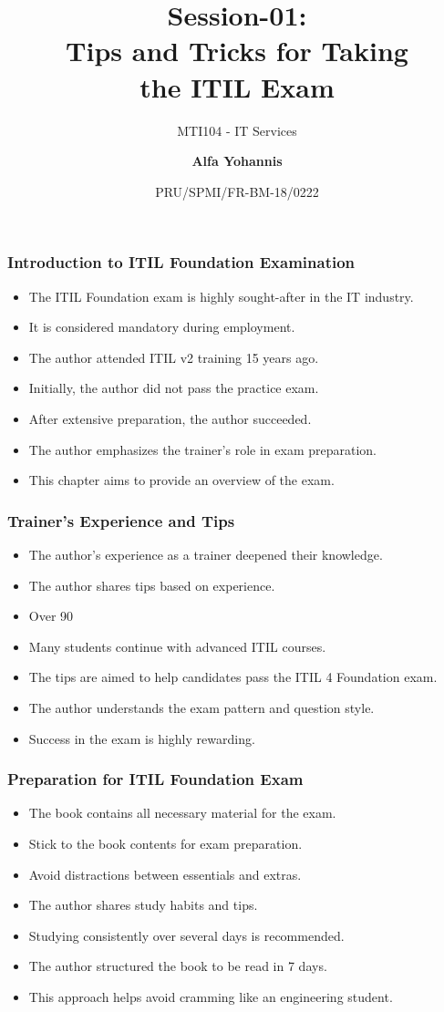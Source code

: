 \documentclass[aspectratio=169, table]{beamer}
\subtitle{MTI104 - IT Services}
\title{Session-01:\\\LARGE{Tips and Tricks for Taking \\the ITIL Exam}}
\date[Serial]{\scriptsize {PRU/SPMI/FR-BM-18/0222}}
\author[Pradita]{\small{\textbf{Alfa Yohannis}}}
\begin{document}
\frame{\titlepage}

\begin{frame}
	\frametitle{Introduction to ITIL Foundation Examination}
	\begin{itemize}
		\item The ITIL Foundation exam is highly sought-after in the IT industry.
		\item It is considered mandatory during employment.
		\item The author attended ITIL v2 training 15 years ago.
		\item Initially, the author did not pass the practice exam.
		\item After extensive preparation, the author succeeded.
		\item The author emphasizes the trainer's role in exam preparation.
		\item This chapter aims to provide an overview of the exam.
	\end{itemize}
\end{frame}

\begin{frame}
	\frametitle{Trainer's Experience and Tips}
	\begin{itemize}
		\item The author's experience as a trainer deepened their knowledge.
		\item The author shares tips based on experience.
		\item Over 90%
		\item Many students continue with advanced ITIL courses.
		\item The tips are aimed to help candidates pass the ITIL 4 Foundation exam.
		\item The author understands the exam pattern and question style.
		\item Success in the exam is highly rewarding.
	\end{itemize}
\end{frame}

\begin{frame}
	\frametitle{Preparation for ITIL Foundation Exam}
	\begin{itemize}
		\item The book contains all necessary material for the exam.
		\item Stick to the book contents for exam preparation.
		\item Avoid distractions between essentials and extras.
		\item The author shares study habits and tips.
		\item Studying consistently over several days is recommended.
		\item The author structured the book to be read in 7 days.
		\item This approach helps avoid cramming like an engineering student.
	\end{itemize}
\end{frame}
\end{document}
